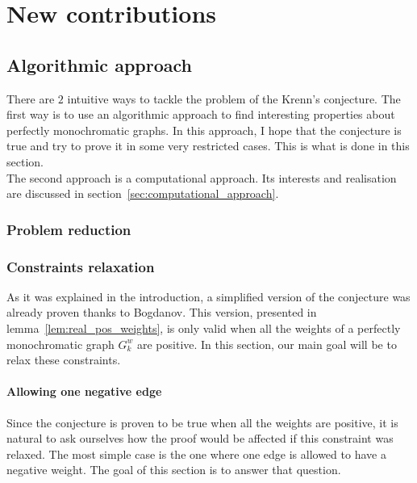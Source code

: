 \chapter{New contributions}
\label{ch:new-contributions}


\section{Algorithmic approach}
\label{sec:algo_approach}

There are $2$ intuitive ways to tackle the problem of the Krenn's conjecture.
The first way is to use an algorithmic approach to find interesting properties about perfectly monochromatic graphs.
In this approach, I hope that the conjecture is true and try to prove it in some very restricted cases.
This is what is done in this section.\\

The second approach is a computational approach.
Its interests and realisation are discussed in section~\ref{sec:computational_approach}.

\subsection{Problem reduction}
\label{subsec:problem_reduction}

\subsection{Constraints relaxation}
\label{subsec:constraints_relaxation}

As it was explained in the introduction, a simplified version of the conjecture was already proven thanks to Bogdanov.\cite{bogdanov}
This version, presented in lemma~\ref{lem:real_pos_weights}, is only valid when all the weights of a perfectly monochromatic graph $G_k^w$ are positive.
In this section, our main goal will be to relax these constraints.

\subsubsection{Allowing one negative edge}
\label{subsubsec:one_negative_edge}

Since the conjecture is proven to be true when all the weights are positive, it is natural to ask ourselves how the proof would be affected if this constraint was relaxed.
The most simple case is the one where one edge is allowed to have a negative weight.
The goal of this section is to answer that question.

